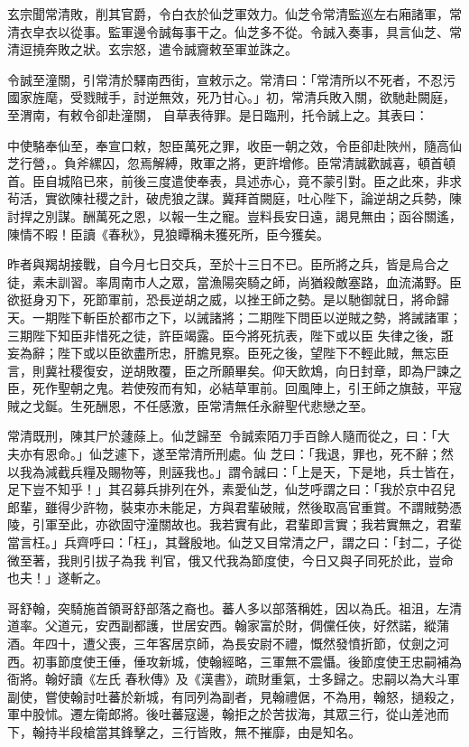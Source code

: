 \begin{pinyinscope}
 玄宗聞常清敗，削其官爵，令白衣於仙芝軍效力。仙芝令常清監巡左右廂諸軍，常清衣皁衣以從事。監軍邊令誠每事干之。仙芝多不從。令誠入奏事，具言仙芝、常清逗撓奔敗之狀。玄宗怒，遣令誠齎敕至軍並誅之。



 令誠至潼關，引常清於驛南西街，宣敕示之。常清曰：「常清所以不死者，不忍污國家旌麾，受戮賊手，討逆無效，死乃甘心。」初，常清兵敗入關，欲馳赴闕庭，至渭南，有敕令卻赴潼關，
 自草表待罪。是日臨刑，托令誠上之。其表曰：



 中使駱奉仙至，奉宣口敕，恕臣萬死之罪，收臣一朝之效，令臣卻赴陜州，隨高仙芝行營，。負斧縲囚，忽焉解縛，敗軍之將，更許增修。臣常清誠歡誠喜，頓首頓首。臣自城陷已來，前後三度遣使奉表，具述赤心，竟不蒙引對。臣之此來，非求茍活，實欲陳社稷之計，破虎狼之謀。冀拜首闕庭，吐心陛下，論逆胡之兵勢，陳討捍之別謀。酬萬死之恩，以報一生之寵。豈料長安日遠，謁見無由；函谷關遙，
 陳情不暇！臣讀《春秋》，見狼瞫稱未獲死所，臣今獲矣。



 昨者與羯胡接戰，自今月七日交兵，至於十三日不已。臣所將之兵，皆是烏合之徒，素未訓習。率周南市人之眾，當漁陽突騎之師，尚猶殺敵塞路，血流滿野。臣欲挺身刃下，死節軍前，恐長逆胡之威，以挫王師之勢。是以馳御就日，將命歸天。一期陛下斬臣於都市之下，以誡諸將；二期陛下問臣以逆賊之勢，將誡諸軍；三期陛下知臣非惜死之徒，許臣竭露。臣今將死抗表，陛下或以臣
 失律之後，誑妄為辭；陛下或以臣欲盡所忠，肝膽見察。臣死之後，望陛下不輕此賊，無忘臣言，則冀社稷復安，逆胡敗覆，臣之所願畢矣。仰天飲鴆，向日封章，即為尸諫之臣，死作聖朝之鬼。若使歿而有知，必結草軍前。回風陣上，引王師之旗鼓，平寇賊之戈鋋。生死酬恩，不任感激，臣常清無任永辭聖代悲戀之至。



 常清既刑，陳其尸於蘧蒢上。仙芝歸至，令誠索陌刀手百餘人隨而從之，曰：「大夫亦有恩命。」仙芝遽下，遂至常清所刑處。仙
 芝曰：「我退，罪也，死不辭；然以我為減截兵糧及賜物等，則誣我也。」謂令誠曰：「上是天，下是地，兵士皆在，足下豈不知乎！」其召募兵排列在外，素愛仙芝，仙芝呼謂之曰：「我於京中召兒郎輩，雖得少許物，裝束亦未能足，方與君輩破賊，然後取高官重賞。不謂賊勢憑陵，引軍至此，亦欲固守潼關故也。我若實有此，君輩即言實；我若實無之，君輩當言枉。」兵齊呼曰：「枉」，其聲殷地。仙芝又目常清之尸，謂之曰：「封二，子從微至著，我則引拔子為我
 判官，俄又代我為節度使，今日又與子同死於此，豈命也夫！」遂斬之。



 哥舒翰，突騎施首領哥舒部落之裔也。蕃人多以部落稱姓，因以為氏。祖沮，左清道率。父道元，安西副都護，世居安西。翰家富於財，倜儻任俠，好然諾，縱蒲酒。年四十，遭父喪，三年客居京師，為長安尉不禮，慨然發憤折節，仗劍之河西。初事節度使王倕，倕攻新城，使翰經略，三軍無不震懾。後節度使王忠嗣補為衙將。翰好讀《左氏
 春秋傳》及《漢書》，疏財重氣，士多歸之。忠嗣以為大斗軍副使，嘗使翰討吐蕃於新城，有同列為副者，見翰禮倨，不為用，翰怒，撾殺之，軍中股怵。遷左衛郎將。後吐蕃寇邊，翰拒之於苦拔海，其眾三行，從山差池而下，翰持半段槍當其鋒擊之，三行皆敗，無不摧靡，由是知名。




\end{pinyinscope}
